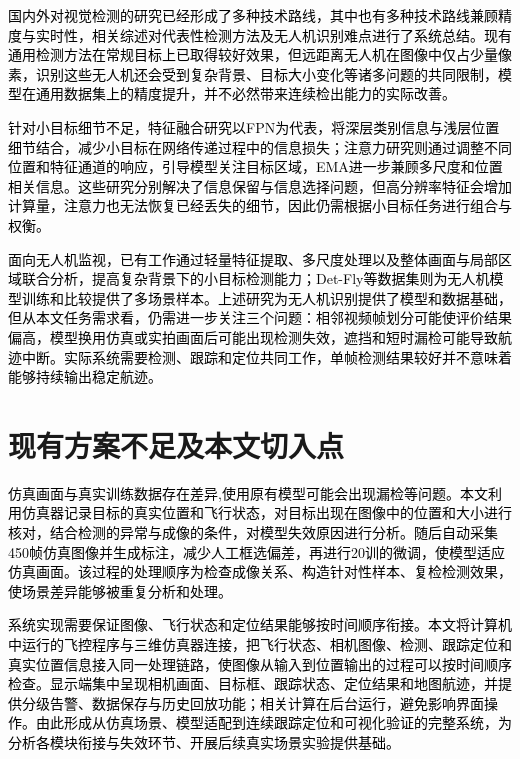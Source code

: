 \textcolor{black}{国内外对视觉检测的研究已经形成了多种技术路线，其中也有多种技术路线兼顾精度与实时性，相关综述对代表性检测方法及无人机识别难点进行了系统总结\cite{bala2025review}。现有通用检测方法在常规目标上已取得较好效果，但远距离无人机在图像中仅占少量像素，识别这些无人机还会受到复杂背景、目标大小变化等诸多问题的共同限制，模型在通用数据集上的精度提升，并不必然带来连续检出能力的实际改善。}

\textcolor{black}{针对小目标细节不足，特征融合研究以FPN为代表，将深层类别信息与浅层位置细节结合，减少小目标在网络传递过程中的信息损失；注意力研究则通过调整不同位置和特征通道的响应，引导模型关注目标区域，EMA进一步兼顾多尺度和位置相关信息\cite{fpn,ema}。这些研究分别解决了信息保留与信息选择问题，但高分辨率特征会增加计算量，注意力也无法恢复已经丢失的细节，因此仍需根据小目标任务进行组合与权衡。}

\textcolor{black}{面向无人机监视，已有工作通过轻量特征提取、多尺度处理以及整体画面与局部区域联合分析，提高复杂背景下的小目标检测能力\cite{yolov8_mpeb,global_local_mav}；Det-Fly等数据集则为无人机模型训练和比较提供了多场景样本\cite{detfly}。上述研究为无人机识别提供了模型和数据基础，但从本文任务需求看，仍需进一步关注三个问题：相邻视频帧划分可能使评价结果偏高，模型换用仿真或实拍画面后可能出现检测失效，遮挡和短时漏检可能导致航迹中断。实际系统需要检测、跟踪和定位共同工作，单帧检测结果较好并不意味着能够持续输出稳定航迹。}

\section{现有方案不足及本文切入点}

\textcolor{black}{仿真画面与真实训练数据存在差异,使用原有模型可能会出现漏检等问题。本文利用仿真器记录目标的真实位置和飞行状态，对目标出现在图像中的位置和大小进行核对，结合检测的异常与成像的条件，对模型失效原因进行分析。随后自动采集450帧仿真图像并生成标注，减少人工框选偏差，再进行20训的微调，使模型适应仿真画面。该过程的处理顺序为检查成像关系、构造针对性样本、复检检测效果，使场景差异能够被重复分析和处理。}

\textcolor{black}{系统实现需要保证图像、飞行状态和定位结果能够按时间顺序衔接。本文将计算机中运行的飞控程序与三维仿真器连接，把飞行状态、相机图像、检测、跟踪定位和真实位置信息接入同一处理链路，使图像从输入到位置输出的过程可以按时间顺序检查。显示端集中呈现相机画面、目标框、跟踪状态、定位结果和地图航迹，并提供分级告警、数据保存与历史回放功能；相关计算在后台运行，避免影响界面操作。由此形成从仿真场景、模型适配到连续跟踪定位和可视化验证的完整系统，为分析各模块衔接与失效环节、开展后续真实场景实验提供基础。}

